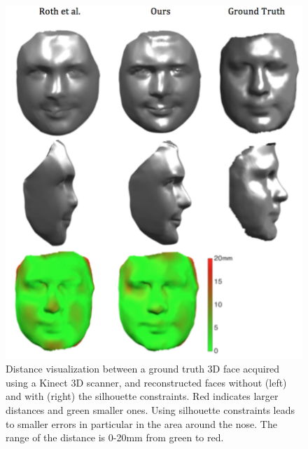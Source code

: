 \begin{figure}[htb]
  \centering
  \includegraphics[width=1\linewidth]{figures/ground_truth3.png}
  \caption{\label{fig:groundtruth}
           Distance visualization between a ground truth 3D face acquired using a Kinect 3D scanner, and reconstructed faces without (left) and with (right) the silhouette constraints. Red indicates larger distances and green smaller ones. Using silhouette constraints leads to smaller errors in particular in the area around the nose. The range of the distance is 0-20mm from green to red.}
\end{figure}

